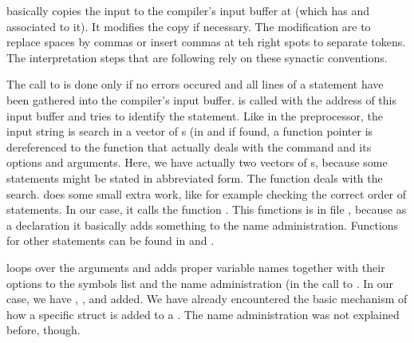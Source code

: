  basically copies the input to the compiler's input buffer at
 (which has  and  associated to it). It
modifies the copy if necessary. The modification are to replace spaces by commas
or insert commas at teh right spots to separate tokens. The interpretation steps
that are following rely on these synactic conventions.

The call to  is done only if no errors occured and all
lines of a statement have been gathered into the compiler's input buffer.
 is called with the address of this input buffer and tries
to identify the statement. Like in the preprocessor, the input string is search
in a vector of s (in  and if found, a function pointer
is dereferenced to the function that actually deals with the command and its
options and arguments.  Here, we have actually two vectors of s,
because some statements might be stated in abbreviated form. The function
 deals with the search.  does some small
extra work, like for example checking the correct order of statements. In our
case, it calls the function . This functions is in file
, because as a declaration it basically adds something to the name
administration. Functions for other statements can be found in 
and .

 loops over the arguments and adds proper variable names together
with their options to the symbols list  and the name
administration (in the call to .  In our case, we have ,
, and  added. We have already encountered the basic mechanism of how a
specific struct is added to a . The name administration was not
explained before, though.


